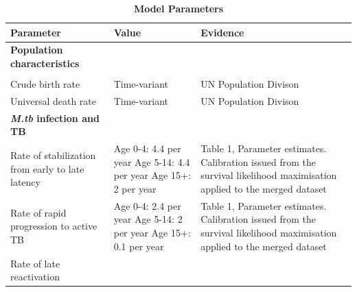 \documentclass{article}
\begin{document}
\begin{table}[!htp]
    \caption{\textbf{Model Parameters}}
    \label{tab:parameter}
    \begin{tabularx}{\textwidth}{ X  X  X }
        \hline
        \textbf{Parameter} & \textbf{Value} & \textbf{Evidence} \\
        \hline
        \textbf{Population characteristics} & & \\
         \\
        Crude birth rate  & Time-variant & UN Population Divison \\
        Universal death rate & Time-variant & UN Population Divison \\
        \hline
        \textbf{\emph{M.tb} infection and TB} \\
        Rate of stabilization from early to late latency &    
        \begin{minipage}[t]{0.3\textwidth}
            Age 0-4: 4.4 per year \newline
            Age 5-14: 4.4 per year \newline
            Age 15+: 2 per year \newline
        \end{minipage}
        & 
        \begin{minipage}[t]{0.3\textwidth}
            Table 1, Parameter estimates. Calibration issued from the survival likelihood maximisation applied 
            to the merged dataset \cite{ragonnet-2017}
        \end{minipage} \\
        Rate of rapid progression to active TB & 
        \begin{minipage}[t]{0.3\textwidth}
            Age 0-4: 2.4 per year \newline
            Age 5-14: 2 per year \newline
            Age 15+: 0.1 per year \newline
        \end{minipage}
        & 
        \begin{minipage}[t]{0.3\textwidth}
            Table 1, Parameter estimates. Calibration issued from the survival likelihood maximisation applied 
            to the merged dataset \cite{ragonnet-2017}
        \end{minipage}  \\
        Rate of late reactivation & 
        \begin{minipage}[t]{0.3\textwidth}

\end{minipage}
\end{tabularx}
\end{table}
\end{document}
